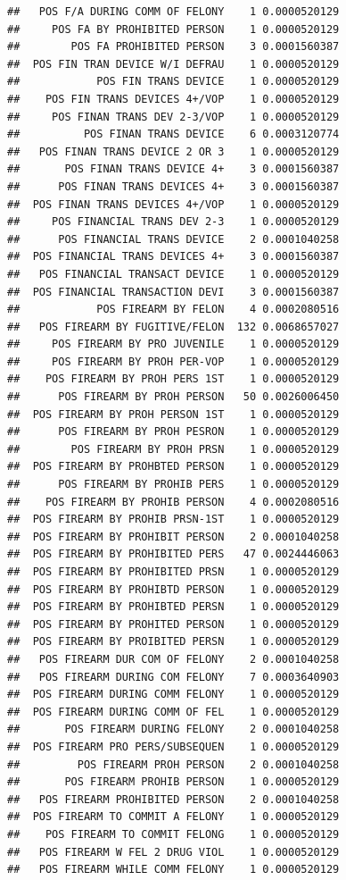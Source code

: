 \documentclass[]{book}
\begin{document}
\begin{verbatim}
##   POS F/A DURING COMM OF FELONY    1 0.0000520129
##     POS FA BY PROHIBITED PERSON    1 0.0000520129
##        POS FA PROHIBITED PERSON    3 0.0001560387
##  POS FIN TRAN DEVICE W/I DEFRAU    1 0.0000520129
##            POS FIN TRANS DEVICE    1 0.0000520129
##    POS FIN TRANS DEVICES 4+/VOP    1 0.0000520129
##     POS FINAN TRANS DEV 2-3/VOP    1 0.0000520129
##          POS FINAN TRANS DEVICE    6 0.0003120774
##   POS FINAN TRANS DEVICE 2 OR 3    1 0.0000520129
##       POS FINAN TRANS DEVICE 4+    3 0.0001560387
##      POS FINAN TRANS DEVICES 4+    3 0.0001560387
##  POS FINAN TRANS DEVICES 4+/VOP    1 0.0000520129
##     POS FINANCIAL TRANS DEV 2-3    1 0.0000520129
##      POS FINANCIAL TRANS DEVICE    2 0.0001040258
##  POS FINANCIAL TRANS DEVICES 4+    3 0.0001560387
##   POS FINANCIAL TRANSACT DEVICE    1 0.0000520129
##  POS FINANCIAL TRANSACTION DEVI    3 0.0001560387
##            POS FIREARM BY FELON    4 0.0002080516
##   POS FIREARM BY FUGITIVE/FELON  132 0.0068657027
##     POS FIREARM BY PRO JUVENILE    1 0.0000520129
##     POS FIREARM BY PROH PER-VOP    1 0.0000520129
##    POS FIREARM BY PROH PERS 1ST    1 0.0000520129
##      POS FIREARM BY PROH PERSON   50 0.0026006450
##  POS FIREARM BY PROH PERSON 1ST    1 0.0000520129
##      POS FIREARM BY PROH PESRON    1 0.0000520129
##        POS FIREARM BY PROH PRSN    1 0.0000520129
##  POS FIREARM BY PROHBTED PERSON    1 0.0000520129
##      POS FIREARM BY PROHIB PERS    1 0.0000520129
##    POS FIREARM BY PROHIB PERSON    4 0.0002080516
##  POS FIREARM BY PROHIB PRSN-1ST    1 0.0000520129
##  POS FIREARM BY PROHIBIT PERSON    2 0.0001040258
##  POS FIREARM BY PROHIBITED PERS   47 0.0024446063
##  POS FIREARM BY PROHIBITED PRSN    1 0.0000520129
##  POS FIREARM BY PROHIBTD PERSON    1 0.0000520129
##  POS FIREARM BY PROHIBTED PERSN    1 0.0000520129
##  POS FIREARM BY PROHITED PERSON    1 0.0000520129
##  POS FIREARM BY PROIBITED PERSN    1 0.0000520129
##   POS FIREARM DUR COM OF FELONY    2 0.0001040258
##   POS FIREARM DURING COM FELONY    7 0.0003640903
##  POS FIREARM DURING COMM FELONY    1 0.0000520129
##  POS FIREARM DURING COMM OF FEL    1 0.0000520129
##       POS FIREARM DURING FELONY    2 0.0001040258
##  POS FIREARM PRO PERS/SUBSEQUEN    1 0.0000520129
##         POS FIREARM PROH PERSON    2 0.0001040258
##       POS FIREARM PROHIB PERSON    1 0.0000520129
##   POS FIREARM PROHIBITED PERSON    2 0.0001040258
##  POS FIREARM TO COMMIT A FELONY    1 0.0000520129
##    POS FIREARM TO COMMIT FELONG    1 0.0000520129
##   POS FIREARM W FEL 2 DRUG VIOL    1 0.0000520129
##   POS FIREARM WHILE COMM FELONY    1 0.0000520129

\end{verbatim}
\end{document}
